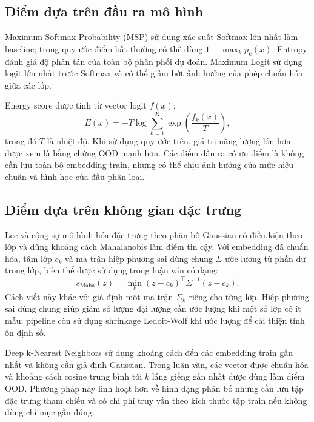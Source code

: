\subsection{Điểm dựa trên đầu ra mô hình}

Maximum Softmax Probability (MSP) \cite{Hendrycks2017MSP} sử dụng xác suất Softmax lớn nhất làm baseline; trong quy ước điểm bất thường có thể dùng $1-\max_k p_k(x)$. Entropy đánh giá độ phân tán của toàn bộ phân phối dự đoán. Maximum Logit \cite{Hendrycks2022MaxLogit} sử dụng logit lớn nhất trước Softmax và có thể giảm bớt ảnh hưởng của phép chuẩn hóa giữa các lớp.

Energy score \cite{Liu2020EnergyOOD} được tính từ vector logit $f(x)$:
\begin{equation}
    E(x)=-T\log\sum_{k=1}^{K}
    \exp\!\left(\frac{f_k(x)}{T}\right),
\end{equation}
trong đó $T$ là nhiệt độ. Khi sử dụng quy ước trên, giá trị năng lượng lớn hơn được xem là bằng chứng OOD mạnh hơn. Các điểm đầu ra có ưu điểm là không cần lưu toàn bộ embedding train, nhưng có thể chịu ảnh hưởng của mức hiệu chuẩn và hình học của đầu phân loại.

\subsection{Điểm dựa trên không gian đặc trưng}

Lee và cộng sự \cite{Lee2018MahalanobisOOD} mô hình hóa đặc trưng theo phân bố Gaussian có điều kiện theo lớp và dùng khoảng cách Mahalanobis làm điểm tin cậy. Với embedding đã chuẩn hóa, tâm lớp $c_k$ và ma trận hiệp phương sai dùng chung $\Sigma$ ước lượng từ phần dư trong lớp, biến thể được sử dụng trong luận văn có dạng:
\begin{equation}
    s_{\mathrm{Maha}}(z)=
    \min_k (z-c_k)^{\top}\Sigma^{-1}(z-c_k).
\end{equation}
Cách viết này khác với giả định một ma trận $\Sigma_k$ riêng cho từng lớp. Hiệp phương sai dùng chung giúp giảm số lượng đại lượng cần ước lượng khi một số lớp có ít mẫu; pipeline còn sử dụng shrinkage Ledoit-Wolf \cite{LedoitWolf2004} khi ước lượng để cải thiện tính ổn định số.

Deep k-Nearest Neighbors \cite{Sun2022KNN} sử dụng khoảng cách đến các embedding train gần nhất và không cần giả định Gaussian. Trong luận văn, các vector được chuẩn hóa và khoảng cách cosine trung bình tới $k$ láng giềng gần nhất được dùng làm điểm OOD. Phương pháp này linh hoạt hơn về hình dạng phân bố nhưng cần lưu tập đặc trưng tham chiếu và có chi phí truy vấn theo kích thước tập train nếu không dùng chỉ mục gần đúng.

